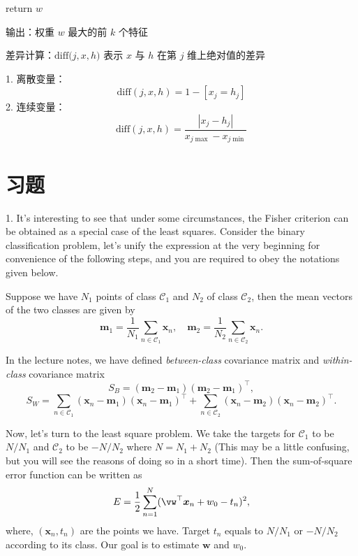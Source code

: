 \documentclass[openany]{ctexbook}
\theoremstyle{kaiti}
\theoremstyle{normal}
\begin{document}
return $w$

输出：权重 $w$ 最大的前 $k$ 个特征

差异计算：$\mathrm{diff(}j,x,h)$ 表示 $x$ 与 $h$ 在第 $j$ 维上绝对值的差异

1. 离散变量：
  \begin{equation}
  \mathrm{diff}(j,x,h)=1-\left[x_j=h_j \right]
  \end{equation}
2. 连续变量：
  \begin{equation}
  \mathrm{diff}(j,x,h)=\frac{|x_j-h_j|}{x_{j\max}-x_{j\min}}
  \end{equation}

\section{习题}


1. It's interesting to see that under some circumstances, the Fisher criterion can be obtained as a special case of the least squares. Consider the binary classification problem, let's unify the expression at the very beginning for convenience of the following steps, and you are required to obey the notations given below.

Suppose we have $N_{1}$ points of class $\mathcal{C}_{1}$ and $N_{2}$ of class $\mathcal{C}_{2}$, then the mean vectors of the two classes are given by
\begin{equation}
  \bm{m}_{1}= \frac{1}{N_{1}}\sum_{n\in \mathcal{C}_{1}}\bm{x}_{n}, 
  \quad
  \bm{m}_{2} = \frac{1}{N_{2}}\sum_{n\in \mathcal{C}_{2}}\bm{x}_{n}.
\end{equation}

In the lecture notes, we have defined \emph{between-class} covariance matrix and \emph{within-class} covariance matrix
\begin{equation}
  S_{B}=(\bm{m}_{2}-\bm{m}_{1})(\bm{m}_{2}-\bm{m}_{1})^{\top}, 
\end{equation}
\begin{equation}
  S_{W}=\sum_{n\in \mathcal{C}_{1}}(\bm{x}_{n}-\bm{m}_{1})(\bm{x}_{n}-\bm{m}_{1})^{\top}+\sum_{n\in \mathcal{C}_{2}}(\bm{x}_{n}-\bm{m}_{2})(\bm{x}_{n}-\bm{m}_{2})^{\top}.
\end{equation}

Now, let's turn to the least square problem. We take the targets for $\mathcal{C}_{1}$ to be $N/N_{1}$ and $\mathcal{C}_{2}$ to be $-N/N_{2}$ where $N=N_{1}+N_{2}$ (This may be a little confusing, but you will see the reasons of doing so in a short time). Then the sum-of-square error function can be written as
\begin{equation}
  E=\frac{1}{2}\sum_{n=1}^{N}(\vw^{\top}\bm{x}_{n}+w_{0}-t_{n})^2,
\end{equation}
where, $(\bm{x}_{n}, t_{n})$ are the points we have. Target $t_{n}$ equals to $N/N_{1}$ or $-N/N_{2}$ according to its class. Our goal is to estimate $\bm{w}$ and $w_{0}$.
\end{document}
